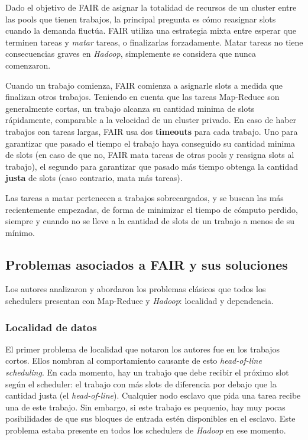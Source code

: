 \vspace{2mm}

Dado el objetivo de FAIR de asignar la totalidad de recursos de un cluster entre las pools que tienen trabajos, la principal pregunta es c\'omo reasignar slots cuando la demanda fluct\'ua. FAIR utiliza una estrategia mixta entre esperar que terminen tareas y \emph{matar} tareas, o finalizarlas forzadamente. Matar tareas no tiene consecuencias graves en \emph{Hadoop}, simplemente se considera que nunca comenzaron.

\vspace{2mm}

Cuando un trabajo comienza, FAIR comienza a asignarle slots a medida que finalizan otros trabajos. Teniendo en cuenta que las tareas Map-Reduce son generalmente cortas, un trabajo alcanza su cantidad minima de slots r\'apidamente, comparable a la velocidad de un cluster privado.
En caso de haber trabajos con tareas largas, FAIR usa dos \textbf{timeouts} para cada trabajo. Uno para garantizar que pasado el tiempo el trabajo haya conseguido su cantidad minima de slots (en caso de que no, FAIR mata tareas de otras pools y reasigna slots al trabajo), el segundo para garantizar que pasado m\'as tiempo obtenga la cantidad \textbf{justa} de slots (caso contrario, mata m\'as tareas).

\vspace{2mm}

Las tareas a matar pertenecen a trabajos sobrecargados, y se buscan las m\'as recientemente empezadas, de forma de minimizar el tiempo de c\'omputo perdido, siempre y cuando no se lleve a la cantidad de slots de un trabajo a menos de su m\'inimo.

\subsection{Problemas asociados a FAIR y sus soluciones}

Los autores analizaron y abordaron los problemas cl\'asicos que todos los schedulers presentan con Map-Reduce y \emph{Hadoop}: localidad y dependencia.

\subsubsection{Localidad de datos}

El primer problema de localidad que notaron los autores fue en los trabajos cortos. Ellos nombran al comportamiento causante de esto \emph{head-of-line scheduling}. En cada momento, hay un trabajo que debe recibir el pr\'oximo slot seg\'un el scheduler: el trabajo con m\'as slots de diferencia por debajo que la cantidad justa (el \emph{head-of-line}). Cualquier nodo esclavo que pida una tarea recibe una de este trabajo. Sin embargo, si este trabajo es pequenio, hay muy pocas posibilidades de que sus bloques de entrada est\'en disponibles en el esclavo. Este problema estaba presente en todos los schedulers de \emph{Hadoop} en ese momento.


